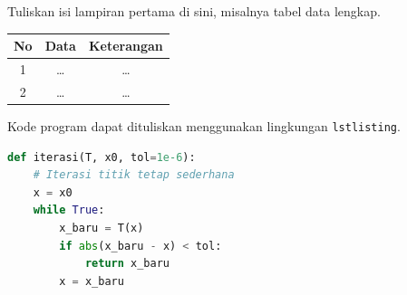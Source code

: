 
\noindent
Tuliskan isi lampiran pertama di sini, misalnya tabel data lengkap.

\begin{center}
  \renewcommand{\arraystretch}{1.2}
  \begin{tabular}{|c|c|c|}
    \hline
    \textbf{No} & \textbf{Data} & \textbf{Keterangan} \\ \hline
    1 & \dots & \dots \\ \hline
    2 & \dots & \dots \\ \hline
  \end{tabular}
\end{center}


\noindent
Kode program dapat dituliskan menggunakan lingkungan \texttt{lstlisting}.

\begin{lstlisting}[language=Python, style=mystyle]
def iterasi(T, x0, tol=1e-6):
    # Iterasi titik tetap sederhana
    x = x0
    while True:
        x_baru = T(x)
        if abs(x_baru - x) < tol:
            return x_baru
        x = x_baru
\end{lstlisting}
